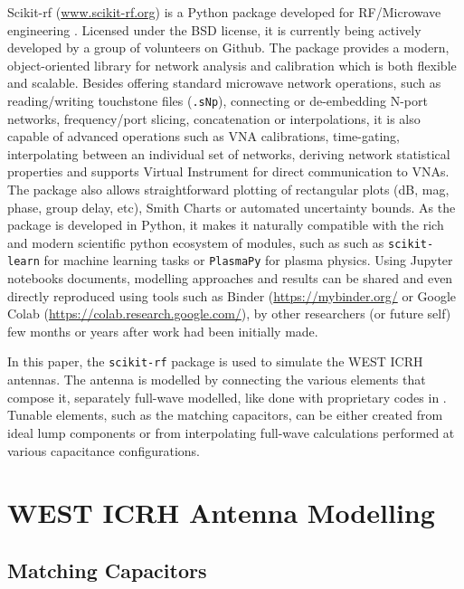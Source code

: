 \documentclass{aip-cp}
\begin{document}
Scikit-rf (\url{www.scikit-rf.org}) is a Python package developed for RF/Microwave engineering  \cite{Arsenovic2018}. Licensed under the BSD license, it is currently being actively developed by a group of volunteers on Github. The package provides a modern, object-oriented library for network analysis and calibration which is both flexible and scalable. Besides offering standard microwave network operations, such as reading/writing touchstone files (\texttt{.sNp}), connecting or de-embedding N-port networks, frequency/port slicing, concatenation or interpolations, it is also capable of advanced operations such as VNA calibrations, time-gating, interpolating between an individual set of networks, deriving network statistical properties and supports Virtual Instrument for direct communication to VNAs. The package also allows straightforward plotting of rectangular plots (dB, mag, phase, group delay, etc), Smith Charts or automated uncertainty bounds. As the package is developed in Python, it makes it naturally compatible with the rich and modern scientific python ecosystem of modules\cite{Millman2011}, such as such as \texttt{scikit-learn} for machine learning tasks or \texttt{PlasmaPy} \cite{PlasmaPyCommunity2018} for plasma physics. Using Jupyter notebooks documents\cite{Kluyver2016}, modelling approaches and results can be shared and even directly reproduced using tools such as Binder (\url{https://mybinder.org/} or Google Colab (\url{https://colab.research.google.com/}), by other researchers (or future self) few months or years after work had been initially made.

In this paper, the \texttt{scikit-rf} package is used to simulate the WEST ICRH antennas. The antenna is modelled by connecting the various elements that compose it, separately full-wave modelled, like done with proprietary codes in 
\cite{Durodie2015, Helou2015, Helou2015a}. Tunable elements, such as the matching capacitors, can be either created from ideal lump components \cite{Helou2016} or from interpolating full-wave calculations performed at various capacitance configurations. 



\section{WEST ICRH Antenna Modelling}
\subsection{Matching Capacitors}
\end{document}
